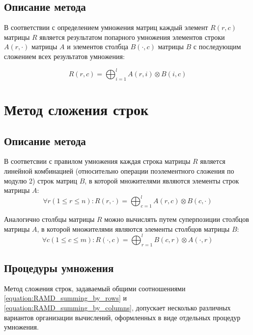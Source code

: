 \documentclass[a4paper,12pt]{report}
\begin{document}
\section { Описание метода }

В соответствии с определением умножения матриц каждый элемент $R(r,c)$ матрицы $R$ является результатом попарного умножения
элементов строки $A(r,\cdot)$ матрицы $A$ и элементов столбца $B(\cdot,c)$ матрицы $B$ с последующим сложением всех результатов
умножения:

$$
	R(r,c) = \bigoplus_{i=1}^{l} A(r,i) \otimes B(i,c)
$$

\chapter { Метод сложения строк } \label{section:RAM_row_addition_method}

\section { Описание метода } \label{section:RAM_description}

В соответсвии с правилом умножения каждая строка матрицы $R$ является линейной комбинацией (относительно операции
поэлементного сложения по модулю 2) строк матриц $B$, в которой множителями являются элементы строк матрицы $A$:
\begin{equation} \label{equation:RAMD_summing_by_rows}
	\forall r ( 1 \le r \le n ) : R(r,\cdot) = \bigoplus_{c=1}^{l} A(r,c) \otimes B(c,\cdot)
\end{equation}

Аналогично столбцы матрицы $R$ можно вычислять путем суперпозиции столбцов матрицы $A$, в которой множителями
являются элементы столбцов матрицы $B$:
\begin{equation} \label{equation:RAMD_summing_by_columns}
	\forall c ( 1 \le c \le m ) : R(\cdot,c) = \bigoplus_{r=1}^{l} B(c,r) \otimes A(\cdot,r) 
\end{equation}

\section { Процедуры умножения }

Метод сложения строк, задаваемый общими соотношениями \ref{equation:RAMD_summing_by_rows} и
\ref{equation:RAMD_summing_by_columns}, допускает несколько различных вариантов организации вычислений,
оформленных в виде отдельных процедур умножения.
\end{document}
